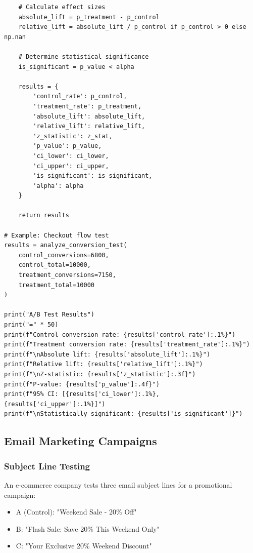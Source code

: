 \begin{lstlisting}
    # Calculate effect sizes
    absolute_lift = p_treatment - p_control
    relative_lift = absolute_lift / p_control if p_control > 0 else np.nan

    # Determine statistical significance
    is_significant = p_value < alpha

    results = {
        'control_rate': p_control,
        'treatment_rate': p_treatment,
        'absolute_lift': absolute_lift,
        'relative_lift': relative_lift,
        'z_statistic': z_stat,
        'p_value': p_value,
        'ci_lower': ci_lower,
        'ci_upper': ci_upper,
        'is_significant': is_significant,
        'alpha': alpha
    }

    return results

# Example: Checkout flow test
results = analyze_conversion_test(
    control_conversions=6800,
    control_total=10000,
    treatment_conversions=7150,
    treatment_total=10000
)

print("A/B Test Results")
print("=" * 50)
print(f"Control conversion rate: {results['control_rate']:.1%}")
print(f"Treatment conversion rate: {results['treatment_rate']:.1%}")
print(f"\nAbsolute lift: {results['absolute_lift']:.1%}")
print(f"Relative lift: {results['relative_lift']:.1%}")
print(f"\nZ-statistic: {results['z_statistic']:.3f}")
print(f"P-value: {results['p_value']:.4f}")
print(f"95% CI: [{results['ci_lower']:.1%}, {results['ci_upper']:.1%}]")
print(f"\nStatistically significant: {results['is_significant']}")
\end{lstlisting}

\subsection{Email Marketing Campaigns}

\subsubsection{Subject Line Testing}

An e-commerce company tests three email subject lines for a promotional campaign:
\begin{itemize}
    \item A (Control): "Weekend Sale - 20\% Off"
    \item B: "Flash Sale: Save 20\% This Weekend Only"
    \item C: "Your Exclusive 20\% Weekend Discount"
\end{itemize}

